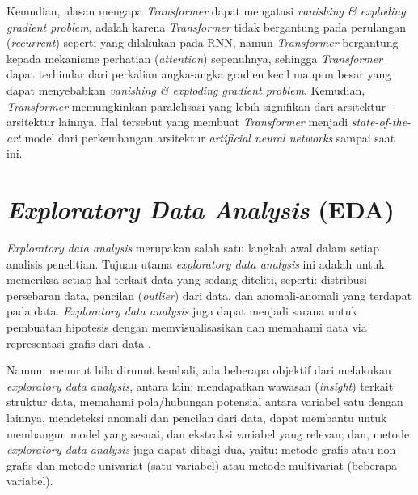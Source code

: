 Kemudian, alasan mengapa \emph{Transformer} dapat mengatasi \emph{vanishing \& exploding gradient problem}, adalah karena \emph{Transformer} tidak bergantung pada perulangan (\emph{recurrent}) seperti yang dilakukan pada RNN, namun \emph{Transformer} bergantung kepada mekanisme perhatian (\emph{attention}) sepenuhnya, sehingga \emph{Transformer} dapat terhindar dari perkalian angka-angka gradien kecil maupun besar yang dapat menyebabkan \emph{vanishing \& exploding gradient problem}. Kemudian, \emph{Transformer} memungkinkan paralelisasi yang lebih signifikan dari arsitektur-arsitektur lainnya. Hal tersebut yang membuat \emph{Transformer} menjadi \emph{state-of-the-art} model dari perkembangan arsitektur \emph{artificial neural networks} sampai saat ini.

\section{\emph{Exploratory Data Analysis} (EDA)}
\emph{Exploratory data analysis} merupakan salah satu langkah awal dalam setiap analisis penelitian. Tujuan utama \emph{exploratory data analysis} ini adalah untuk memeriksa setiap hal terkait data yang sedang diteliti, seperti: distribusi persebaran data, pencilan (\emph{outlier}) dari data, dan anomali-anomali yang terdapat pada data. \emph{Exploratory data analysis} juga dapat menjadi sarana untuk pembuatan hipotesis dengan memvisualisasikan dan memahami data via representasi grafis dari data \citep{exploratory-data-analysis}. 

Namun, menurut \citet{exploratory-data-analysis} bila dirunut kembali, ada beberapa objektif dari melakukan \emph{exploratory data analysis}, antara lain: mendapatkan wawasan (\emph{insight}) terkait struktur data, memahami pola/hubungan potensial antara variabel satu dengan lainnya, mendeteksi anomali dan pencilan dari data, dapat membantu untuk membangun model yang sesuai, dan ekstraksi variabel yang relevan; dan, metode \emph{exploratory data analysis} juga dapat dibagi dua, yaitu: metode grafis atau non-grafis dan metode univariat (satu variabel) atau metode multivariat (beberapa variabel).

